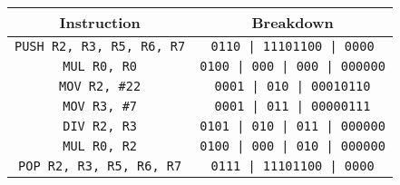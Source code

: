 \begin{tabular}{cc}
    \toprule
    \textbf{Instruction}             & \textbf{Breakdown}                 \\
    \midrule
    \texttt{PUSH R2, R3, R5, R6, R7} & \texttt{0110 | 11101100 | 0000}    \\
    \midrule
    \texttt{MUL R0, R0}              & \texttt{0100 | 000 | 000 | 000000} \\
    \midrule
    \texttt{MOV R2, \#22}            & \texttt{0001 | 010 | 00010110}     \\
    \midrule
    \texttt{MOV R3, \#7}             & \texttt{0001 | 011 | 00000111}     \\
    \midrule
    \texttt{DIV R2, R3}              & \texttt{0101 | 010 | 011 | 000000} \\
    \midrule
    \texttt{MUL R0, R2}              & \texttt{0100 | 000 | 010 | 000000} \\
    \midrule
    \texttt{POP R2, R3, R5, R6, R7}  & \texttt{0111 | 11101100 | 0000}    \\
    \bottomrule
\end{tabular}
